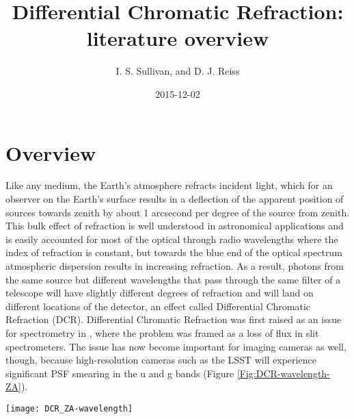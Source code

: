 \documentclass[DM,authoryear,toc]{lsstdoc}
\title[DCR Literature Overview]{Differential Chromatic Refraction: literature overview}
\author{I. S. Sullivan, and D. J. Reiss}
\date{2015-12-02}
\begin{document}
\maketitle

\section{Overview}
Like any medium, the Earth's atmosphere refracts incident light, which for an observer on the Earth's surface results in a deflection of the apparent position of sources towards zenith by about 1 arcsecond per degree of the source from zenith. This bulk effect of refraction is well understood in astronomical applications and is easily accounted for most of the optical through radio wavelengths where the index of refraction is constant, but towards the blue end of the optical spectrum atmospheric dispersion results in increasing refraction. As a result, photons from the same source but different wavelengths that pass through the same filter of a telescope will have slightly different degrees of refraction and will land on different locations of the detector, an effect called Differential Chromatic Refraction (DCR). Differential Chromatic Refraction was first raised as an issue for spectrometry in \cite{Filippenko1982}, where the problem was framed as a loss of flux in slit spectrometers. The issue has now become important for imaging cameras as well, though, because high-resolution cameras such as the LSST will experience significant PSF smearing in the u and g bands (Figure  \ref{Fig:DCR-wavelength-ZA}).


\begin{figure*}
	\begin{center}
		\texttt{[image: DCR\_ZA-wavelength]}
		\caption{Maximum DCR over a range of zenith angles and wavelengths. Each wavelength is treated as the center wavelength of a band with bandwidth interpolated between the actual LSST bands (black lines), and maximum DCR is calculated for the difference in position of two photons from the same source at opposite ends of the band.}
		\label{Fig:DCR-wavelength-ZA}
\end{center}
\end{figure*}
\begin{figure*}
	\begin{center}
		\caption{Investigation of maximum DCR under varying conditions for LSST u' band. For a given filter, maximum DCR depends on the zenith angle of observation (airmass), atmospheric pressure, temperature, and, to a lessor degree, humidity. In panels (a) - (c) we keep one of the three main parameters fixed at a nominal value, and map the full range of realistic observing conditions for the remaining two to get a feel for the relative importance of each.}
		\label{Fig:DCR-P-T}
	\end{center}
\end{figure*}
\end{document}
